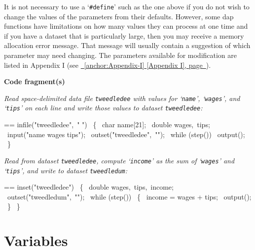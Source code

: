 \documentclass{book}
\makeatletter
\newenvironment{Texinfopreformatted}{%
  \par\GNUTobeylines\obeyspaces\frenchspacing\parskip=\z@\parindent=\z@}{}
{\catcode`\^^M=13 \gdef\GNUTobeylines{\catcode`\^^M=13 \def^^M{\null\par}}}
\newenvironment{Texinfoindented}{\begin{list}{}{}\item\relax}{\end{list}}
\renewcommand{\_}{\Texinfounderscore\discretionary{}{}{}}
\makeatother
\begin{document}
It is not necessary to use a `\texttt{\#define}' such as the one above
if you do not wish to change the values of the parameters from their defaults.
However, some dap functions have limitations
%
%
on how many values
they can process at one time and if you have a dataset that is particularly large,
then you may receive a memory allocation error message.
That message will usually contain a suggestion of which parameter
may need changing.  The parameters available for modification are listed
in Appendix I (see \hyperref[anchor:Appendix-I]{\chaptername~\ref*{anchor:Appendix-I} [Appendix I], page~\pageref*{anchor:Appendix-I}}).

\noindent{}\textbf{Code fragment(s)}

\emph{Read space-delimited data file \texttt{tweedledee} with
values for `\texttt{name}', `\texttt{wages}', and `\texttt{tips}' on each line and
write those values to dataset \texttt{tweedledee}:}
\begin{Texinfoindented}
\begin{Texinfopreformatted}%
\ttfamily infile("tweedledee",\ " ")
\  \{
\    char name[21];
\    double wages,\ tips;
\    input("name wages tips");
\    outset("tweedledee",\ "");
\    while (step())
\      output();
\  \}
\end{Texinfopreformatted}
\end{Texinfoindented}

\emph{Read from dataset \texttt{tweedledee}, compute `\texttt{income}'
as the sum of `\texttt{wages}' and `\texttt{tips}',
and write to dataset \texttt{tweedledum}:}
\begin{Texinfoindented}
\begin{Texinfopreformatted}%
\ttfamily inset("tweedledee")
\  \{
\    double wages,\ tips,\ income;
\    outset("tweedledum",\ "");
\    while (step())
\      \{
\        income = wages + tips;
\        output();
\      \}
\  \}
\end{Texinfopreformatted}
\end{Texinfoindented}

\section{{Variables}}
\label{anchor:Variables}%
\end{document}
